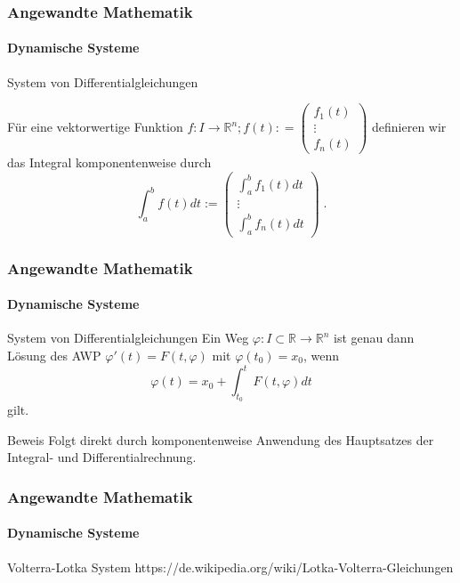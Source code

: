\documentclass{beamer}
\begin{document}
\begin{frame}
    \frametitle{Angewandte Mathematik}
\framesubtitle{Dynamische Systeme }
\begin{block}{System von Differentialgleichungen}

Für eine  vektorwertige Funktion  $f : I   \to \mathbb{R}^n; f(t) : = \begin{pmatrix} f_1(t)  \\ \vdots \\ f_n(t) \end{pmatrix}$ definieren wir das Integral komponentenweise durch
$$\int_{a}^{b}  f(t) dt := \begin{pmatrix} \int_{a}^{b}  f_1(t) dt  \\ \vdots \\ \int_{a}^{b}  f_n(t) dt \end{pmatrix} \; .$$
\end{block}
 \end{frame}

\begin{frame}
    \frametitle{Angewandte Mathematik}
\framesubtitle{Dynamische Systeme }
\begin{block}{System von Differentialgleichungen}
Ein Weg $\varphi : I \subset \mathbb{R} \to \mathbb{R}^n$ ist genau dann Lösung des AWP $\varphi'(t) = F(t , \varphi)$ mit $ \varphi(t_0)= x_0$, wenn
$$ \varphi(t) =  x_0 + \int_{t_0}^{t} F(t, \varphi) dt$$
gilt.
\end{block}
\begin{block}{Beweis}
Folgt direkt durch komponentenweise Anwendung des Hauptsatzes der Integral- und Differentialrechnung.
\end{block}
 \end{frame}



\begin{frame}
    \frametitle{Angewandte Mathematik}
\framesubtitle{Dynamische Systeme }

\begin{block}{Volterra-Lotka System}
https://de.wikipedia.org/wiki/Lotka-Volterra-Gleichungen
\end{block}
 \end{frame}
\end{document}
